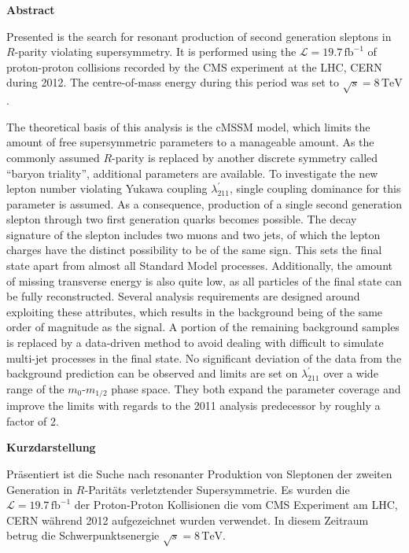 \documentclass[11pt,a4paper,twoside,openright,DIV=13,BCOR=1cm]{scrbook} %
\numberwithin{equation}{chapter} %
\numberwithin{figure}{chapter} %
\numberwithin{table}{chapter} %
\begin{document}

\newpage

\begin{center} \textbf{Abstract} \end{center}
\noindent Presented is the search for resonant production of second generation sleptons in $R$-parity violating supersymmetry. It is performed using the $\mathcal{L} = 19.7\,\text{fb}^{-1}$ of proton-proton collisions recorded by the CMS experiment at the LHC, CERN during 2012. The centre-of-mass energy during this period was set to $\sqrt{s} = 8\,\text{TeV}$.

The theoretical basis of this analysis is the cMSSM model, which limits the amount of free supersymmetric parameters to a manageable amount. As the commonly assumed $R$-parity is replaced by another discrete symmetry called ``baryon triality'', additional parameters are available. To investigate the new lepton number violating Yukawa coupling $\lambda^\prime_{211}$, single coupling dominance for this parameter is assumed. As a consequence, production of a single second generation slepton through two first generation quarks becomes possible. The decay signature of the slepton includes two muons and two jets, of which the lepton charges have the distinct possibility to be of the same sign. This sets the final state apart from almost all Standard Model processes. Additionally, the amount of missing transverse energy is also quite low, as all particles of the final state can be fully reconstructed. Several analysis requirements are designed around exploiting these attributes, which results in the background being of the same order of magnitude as the signal. A portion of the remaining background samples is replaced by a data-driven method to avoid dealing with difficult to simulate multi-jet processes in the final state. No significant deviation of the data from the background prediction can be observed and limits are set on $\lambda^\prime_{211}$ over a wide range of the $m_0$-$m_{1/2}$ phase space. They both expand the parameter coverage and improve the limits with regards to the 2011 analysis predecessor by roughly a factor of 2.


\newpage
\begin{center} \textbf{Kurzdarstellung} \end{center}
\noindent Präsentiert ist die Suche nach resonanter Produktion von Sleptonen der zweiten Generation in $R$-Paritäts verletztender Supersymmetrie. Es wurden die $\mathcal{L} = 19.7\,\text{fb}^{-1}$ der Proton-Proton Kollisionen die vom CMS Experiment am LHC, CERN während 2012 aufgezeichnet wurden verwendet. In diesem Zeitraum betrug die Schwerpunktsenergie $\sqrt{s} = 8\,\text{TeV}$.
\end{document}

